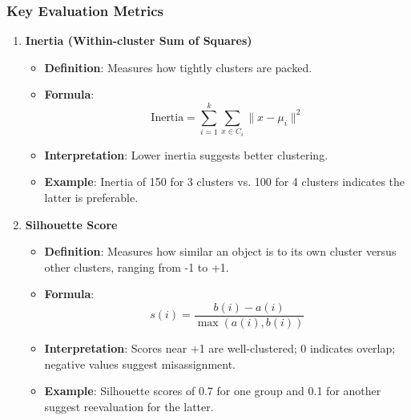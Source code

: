 \documentclass[aspectratio=169]{beamer}
\begin{document}
\begin{frame}[fragile]
    \frametitle{Key Evaluation Metrics}
    \begin{enumerate}
        \item \textbf{Inertia (Within-cluster Sum of Squares)}
            \begin{itemize}
                \item \textbf{Definition}: Measures how tightly clusters are packed.
                \item \textbf{Formula}:
                \begin{equation}
                \text{Inertia} = \sum_{i=1}^k \sum_{x \in C_i} \|x - \mu_i\|^2
                \end{equation}
                \item \textbf{Interpretation}: Lower inertia suggests better clustering.
                \item \textbf{Example}: Inertia of 150 for 3 clusters vs. 100 for 4 clusters indicates the latter is preferable.
            \end{itemize}
        
        \item \textbf{Silhouette Score}
            \begin{itemize}
                \item \textbf{Definition}: Measures how similar an object is to its own cluster versus other clusters, ranging from -1 to +1.
                \item \textbf{Formula}:
                \begin{equation}
                s(i) = \frac{b(i) - a(i)}{\max(a(i), b(i))}
                \end{equation}
                \item \textbf{Interpretation}: Scores near +1 are well-clustered; 0 indicates overlap; negative values suggest misassignment.
                \item \textbf{Example}: Silhouette scores of 0.7 for one group and 0.1 for another suggest reevaluation for the latter.
            \end{itemize}
    \end{enumerate}
\end{frame}
\end{document}
